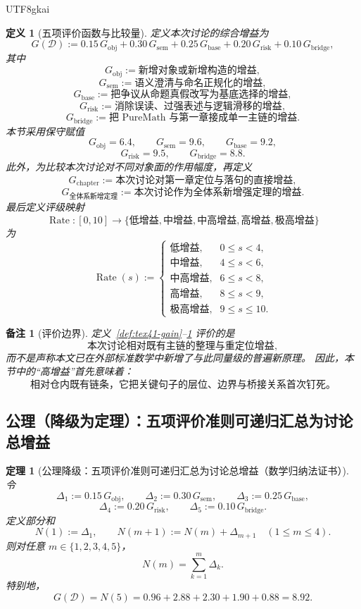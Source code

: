 \documentclass[12pt]{article}
\newtheorem{definition}{定义}[section]
\newtheorem{theorem}{定理}[section]
\newtheorem{remark}{备注}[section]
\newcommand{\Rate}{\operatorname{Rate}}
\begin{document}
\begin{CJK*}{UTF8}{gkai}
\begin{definition}[五项评价函数与比较量]
\label{def:tex41-gain-rate}
定义本次讨论的综合增益为
\[
  G(\mathcal D)
  :=
  0.15\,G_{\mathrm{obj}}
  +
  0.30\,G_{\mathrm{sem}}
  +
  0.25\,G_{\mathrm{base}}
  +
  0.20\,G_{\mathrm{risk}}
  +
  0.10\,G_{\mathrm{bridge}},
\]
其中
\[
  G_{\mathrm{obj}}
  :=
  \text{新增对象或新增构造的增益},
\]
\[
  G_{\mathrm{sem}}
  :=
  \text{语义澄清与命名正规化的增益},
\]
\[
  G_{\mathrm{base}}
  :=
  \text{把争议从命题真假改写为基底选择的增益},
\]
\[
  G_{\mathrm{risk}}
  :=
  \text{消除误读、过强表述与逻辑滑移的增益},
\]
\[
  G_{\mathrm{bridge}}
  :=
  \text{把 PureMath 与第一章接成单一主链的增益}.
\]
本节采用保守赋值
\[
  G_{\mathrm{obj}}=6.4,\qquad
  G_{\mathrm{sem}}=9.6,\qquad
  G_{\mathrm{base}}=9.2,
\]
\[
  G_{\mathrm{risk}}=9.5,\qquad
  G_{\mathrm{bridge}}=8.8.
\]
此外，为比较本次讨论对不同对象面的作用幅度，再定义
\[
  G_{\mathrm{chapter}}
  :=
  \text{本次讨论对第一章定位与落句的直接增益},
\]
\[
  G_{\text{全体系新增定理}}
  :=
  \text{本次讨论作为全体系新增强定理的增益}.
\]
最后定义评级映射
\[
  \Rate:[0,10]\to
  \{\text{低增益},\text{中增益},\text{中高增益},\text{高增益},\text{极高增益}\}
\]
为
\[
  \Rate(s):=
  \begin{cases}
    \text{低增益}, & 0\le s<4,\\
    \text{中增益}, & 4\le s<6,\\
    \text{中高增益}, & 6\le s<8,\\
    \text{高增益}, & 8\le s<9,\\
    \text{极高增益}, & 9\le s\le 10.
  \end{cases}
\]
\end{definition}

\begin{remark}[评价边界]
定义~\ref{def:tex41-gain}--\ref{def:tex41-gain-rate} 评价的是
\[
  \text{本次讨论相对既有主链的整理与重定位增益},
\]
而不是声称本文已在外部标准数学中新增了与此同量级的普遍新原理。
因此，本节中的“高增益”首先意味着：
\[
  \text{相对仓内既有链条，它把关键句子的层位、边界与桥接关系首次钉死。}
\]
\end{remark}

\subsection{公理（降级为定理）：五项评价准则可递归汇总为讨论总增益}
\label{subsec:tex41-ch2-axiom}

\begin{theorem}[公理降级：五项评价准则可递归汇总为讨论总增益（数学归纳法证书）]
\label{thm:tex41-gain-decomposition}
令
\[
  \Delta_1:=0.15\,G_{\mathrm{obj}},\qquad
  \Delta_2:=0.30\,G_{\mathrm{sem}},\qquad
  \Delta_3:=0.25\,G_{\mathrm{base}},
\]
\[
  \Delta_4:=0.20\,G_{\mathrm{risk}},\qquad
  \Delta_5:=0.10\,G_{\mathrm{bridge}}.
\]
定义部分和
\[
  N(1):=\Delta_1,
  \qquad
  N(m+1):=N(m)+\Delta_{m+1}
  \quad(1\le m\le 4).
\]
则对任意 $m\in\{1,2,3,4,5\}$，
\[
  N(m)=\sum_{k=1}^{m}\Delta_k.
\]
特别地，
\[
  G(\mathcal D)=N(5)=0.96+2.88+2.30+1.90+0.88=8.92.
\]
\end{theorem}


\end{CJK*}
\end{document}
